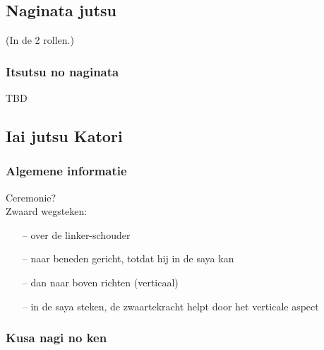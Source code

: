 \subsection{Naginata jutsu}
(In de 2 rollen.)

\subsubsection{Itsutsu no naginata}

TBD

\subsection{Iai jutsu Katori}

\subsubsection{Algemene informatie}

Ceremonie?\\

Zwaard wegsteken:
\begin{itemize}
\item[--] over de linker-schouder
\item[--] naar beneden gericht, totdat hij in de saya kan
\item[--] dan naar boven richten (verticaal)
\item[--] in de saya steken, de zwaartekracht helpt door het verticale aspect
\end{itemize}


\subsubsection{Kusa nagi no ken}

